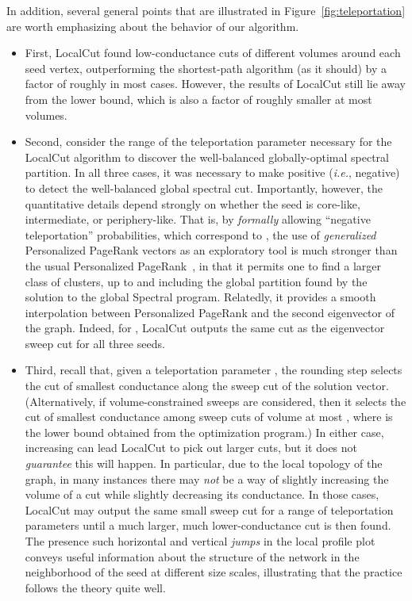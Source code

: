 \documentclass[11pt]{article}
\begin{document}
\noindent
In addition, several general points that are illustrated in 
Figure~\ref{fig:teleportation} are worth emphasizing about the 
behavior of our algorithm.
\begin{itemize}
\item
First, \textsf{LocalCut} found low-conductance cuts of different volumes 
around each seed vertex, outperforming the shortest-path algorithm (as it 
should) by a factor of roughly  in most cases. 
However, the results of \textsf{LocalCut} still lie away from the lower 
bound, which is also a factor of roughly  smaller at most volumes. 
\item
Second, consider the range of the teleportation parameter necessary for the 
\textsf{LocalCut} algorithm to discover the well-balanced globally-optimal 
spectral partition.
In all three cases, it was necessary to make  positive 
(\emph{i.e.},  negative) to detect the well-balanced global 
spectral cut.
Importantly, however, the quantitative details depend strongly on whether the
seed is core-like, intermediate, or periphery-like.
That is, by \emph{formally} allowing ``negative teleportation'' 
probabilities, which correspond to , the use of 
\emph{generalized} Personalized PageRank vectors as an exploratory tool is 
much stronger than the usual Personalized 
PageRank~\cite{andersen06local,andersen06seed}, in that it permits one to 
find a larger class of clusters, up to and including the global partition 
found by the solution to the global \textsf{Spectral} program.
Relatedly, it provides a smooth interpolation between Personalized PageRank
and the second eigenvector of the graph. 
Indeed, for , \textsf{LocalCut} 
outputs the same cut as the eigenvector sweep cut for all three seeds.
\item
Third, recall that, given a teleportation parameter , the rounding 
step selects the cut of smallest conductance along the sweep cut of the 
solution vector.
(Alternatively, if volume-constrained sweeps are considered, then it selects 
the cut of smallest conductance among sweep cuts of volume at most 
, where  is the lower bound obtained from the 
optimization program.)
In either case, increasing  can lead \textsf{LocalCut} 
to pick out larger cuts, but it does not \emph{guarantee} this will happen. 
In particular, due to the local topology of the graph, in many instances 
there may \emph{not} be a way of slightly increasing the volume of a cut 
while slightly decreasing its conductance. 
In those cases, \textsf{LocalCut} may output the same small sweep cut for a 
range of teleportation parameters until a much larger, much lower-conductance 
cut is then found.
The presence such horizontal and vertical \textit{jumps} in the local 
profile plot conveys useful information about the structure of the network 
in the neighborhood of the seed at different size scales, illustrating that 
the practice follows the theory quite well.
\end{itemize}
\end{document}
